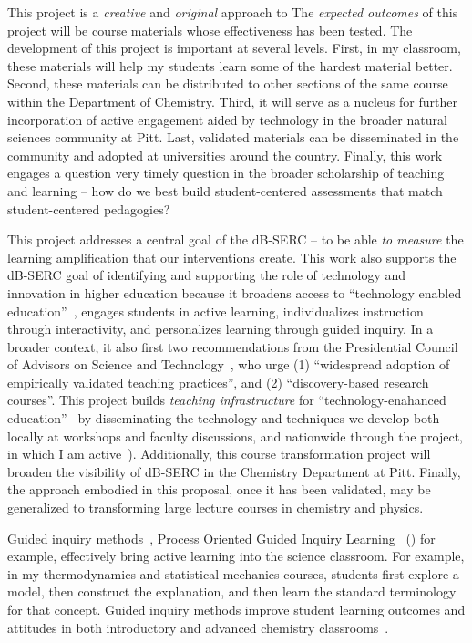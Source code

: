 \documentclass[10pt,letterpaper]{article}
\begin{document}
This project is a \textit{creative} and \textit{original} approach to 
%
The \textit{expected outcomes} of this project will be course materials whose effectiveness has been tested. 
%
The development of this project is important at several levels. First, in my classroom, these materials will help my students learn some of the hardest material better. Second, these materials can be distributed to other sections of the same course within the Department of Chemistry. Third, it will serve as a nucleus for further incorporation of active engagement aided by technology in the broader natural sciences community at Pitt. Last, validated materials can be disseminated in the \pogil community and adopted at universities around the country. 
%
Finally, this work engages a question very timely question in the broader scholarship of teaching and learning -- how do we best build student-centered assessments that match student-centered pedagogies? 

This project addresses a central goal of the dB-SERC -- to be able \textit{to measure} the learning amplification that our interventions create. This work also supports the dB-SERC goal of identifying and supporting the role of technology and innovation in higher education because it broadens access to ``technology enabled education''~\cite{Zuckerman2013}, engages students in active learning, individualizes instruction through interactivity, and personalizes learning through guided inquiry.  In a broader context, it also first two recommendations from the Presidential Council of Advisors on Science and Technology~\cite{PCAST2012}, who urge (1) ``widespread adoption of empirically validated teaching practices'', and (2) ``discovery-based research courses''. This project builds \textit{teaching infrastructure} for ``technology-enahanced education''~\cite{Zuckerman2013} by disseminating the technology and techniques we develop both locally at workshops and faculty discussions, and nationwide through the \pogil project, in which I am active~\cite{sgrACS-14a}). 
Additionally, this course transformation project will broaden the visibility of dB-SERC in the Chemistry Department at Pitt. Finally, the approach embodied in this proposal, once it has been validated, may be generalized to transforming large lecture courses in chemistry and physics.

%


Guided inquiry methods~\cite{farrellJCE-99,lewisJCE-05,minderhoutBMBE-07,moog-08,eberleinBMBE-08}, Process Oriented Guided Inquiry Learning~\cite{moog-08} (\pogil) for example, effectively bring active learning into the science classroom. For example, in my thermodynamics and statistical mechanics courses, students first explore a model, then construct the explanation, and then learn the standard terminology for that concept. Guided inquiry methods improve student learning outcomes and attitudes in both introductory and advanced chemistry classrooms~\cite{lewisJCE-05}. 
\end{document}
